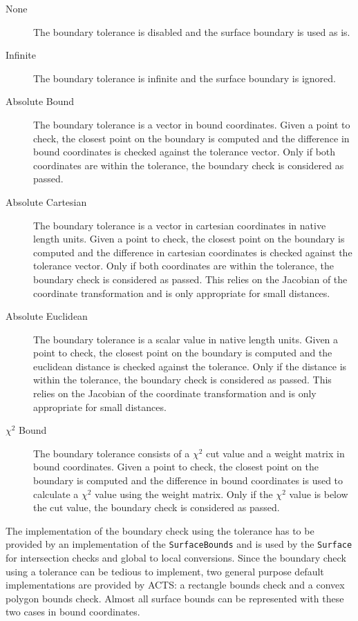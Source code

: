 \begin{description}
    \item[None] The boundary tolerance is disabled and the surface boundary is used as is.
    \item[Infinite] The boundary tolerance is infinite and the surface boundary is ignored.
    \item[Absolute Bound] The boundary tolerance is a vector in bound coordinates. Given a point to check, the closest point on the boundary is computed and the difference in bound coordinates is checked against the tolerance vector. Only if both coordinates are within the tolerance, the boundary check is considered as passed.
    \item[Absolute Cartesian] The boundary tolerance is a vector in cartesian coordinates in native length units. Given a point to check, the closest point on the boundary is computed and the difference in cartesian coordinates is checked against the tolerance vector. Only if both coordinates are within the tolerance, the boundary check is considered as passed. This relies on the Jacobian of the coordinate transformation and is only appropriate for small distances.
    \item[Absolute Euclidean] The boundary tolerance is a scalar value in native length units. Given a point to check, the closest point on the boundary is computed and the euclidean distance is checked against the tolerance. Only if the distance is within the tolerance, the boundary check is considered as passed. This relies on the Jacobian of the coordinate transformation and is only appropriate for small distances.
    \item[$\chi^2$ Bound] The boundary tolerance consists of a $\chi^2$ cut value and a weight matrix in bound coordinates. Given a point to check, the closest point on the boundary is computed and the difference in bound coordinates is used to calculate a $\chi^2$ value using the weight matrix. Only if the $\chi^2$ value is below the cut value, the boundary check is considered as passed.
\end{description}

The implementation of the boundary check using the tolerance has to be provided by an implementation of the \texttt{SurfaceBounds} and is used by the \texttt{Surface} for intersection checks and global to local conversions. Since the boundary check using a tolerance can be tedious to implement, two general purpose default implementations are provided by ACTS: a rectangle bounds check and a convex polygon bounds check. Almost all surface bounds can be represented with these two cases in bound coordinates.

